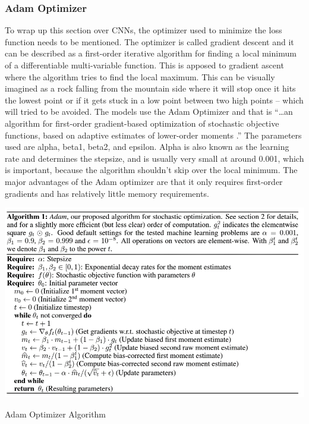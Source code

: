 \documentclass[12pt]{article}
\begin{document}
            \subsubsection{Adam Optimizer}

                To wrap up this section over CNNs, the optimizer used to minimize the loss function needs to be mentioned. 
                The optimizer is called gradient descent and it can be described as a first-order iterative algorithm 
                for finding a local minimum of a differentiable multi-variable function. 
                This is apposed to gradient ascent where the algorithm tries to find the local maximum. 
                This can be visually imagined as a rock falling from the mountain side 
                where it will stop once it hits the lowest point or if it gets stuck in a low point between two high points -- 
                which will tried to be avoided. The models use the Adam Optimizer and that is “…an algorithm 
                for first-order gradient-based optimization of stochastic objective functions, based on adaptive estimates 
                of lower-order moments \cite{kingma2015}.” The parameters used are alpha, beta1, beta2, and epsilon. 
                Alpha is also known as the learning rate and determines the stepsize, 
                and is usually very small at around 0.001, which is important, 
                because the algorithm shouldn’t skip over the local minimum. 
                The major advantages of the Adam optimizer are that it only requires first-order gradients 
                and has relatively little memory requirements.

                \begin{table}[ht]
                
                    \begin{center}

                        \includegraphics[scale=0.9]{adam-opt.png}
                        \caption{Adam Optimizer Algorithm \cite{kingma2015}}
            
                    \end{center}
                    
                \end{table}
\end{document}
